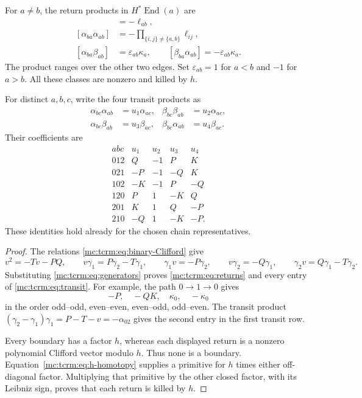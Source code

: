 \begin{proposition}\label{mc:tcrm:prop:composites}
For $a\ne b$, the return products in
$H^*\operatorname{End}(a)$ are
\begin{align}
 [\beta_{ba}\beta_{ab}]&=-\ell_{ab},\nonumber\\
 [\alpha_{ba}\alpha_{ab}]&=-
       \prod_{\{i,j\}\ne\{a,b\}}\ell_{ij},
       \label{mc:tcrm:eq:returns}\\
 [\alpha_{ba}\beta_{ab}]&=\varepsilon_{ab}\kappa_a,
 \qquad
 [\beta_{ba}\alpha_{ab}]=-\varepsilon_{ab}\kappa_a.
       \nonumber
\end{align}
The product ranges over the other two edges.
Set $\varepsilon_{ab}=1$ for $a<b$ and $-1$ for $a>b$.
All these classes are nonzero and killed by $h$.

For distinct $a,b,c$, write the four transit products as
\[
 \begin{aligned}
 \alpha_{bc}\alpha_{ab}&=u_1\alpha_{ac},&
 \beta_{bc}\beta_{ab}&=u_2\alpha_{ac},\\
 \alpha_{bc}\beta_{ab}&=u_3\beta_{ac},&
 \beta_{bc}\alpha_{ab}&=u_4\beta_{ac}.
 \end{aligned}
\]
Their coefficients are
\begin{equation}\label{mc:tcrm:eq:transit}
\begin{array}{c|rrrr}
 abc&u_1&u_2&u_3&u_4\\ \hline
 012&Q&-1&P&K\\
 021&-P&-1&-Q&K\\
 102&-K&-1&P&-Q\\
 120&P&1&-K&Q\\
 201&K&1&Q&-P\\
 210&-Q&1&-K&-P.
\end{array}
\end{equation}
These identities hold already for the chosen chain
representatives.
\end{proposition}

\begin{proof}
The relations \eqref{mc:tcrm:eq:binary-Clifford} give
\[
 v^2=-Tv-PQ,\qquad
 v\gamma_1=P\gamma_2-T\gamma_1,\qquad
 \gamma_1v=-P\gamma_2,\qquad
 v\gamma_2=-Q\gamma_1,\qquad
 \gamma_2v=Q\gamma_1-T\gamma_2.
\]
Substituting \eqref{mc:tcrm:eq:generators} proves
\eqref{mc:tcrm:eq:returns} and every entry of
\eqref{mc:tcrm:eq:transit}. For example, the path
$0\to1\to0$ gives
\[
 -P,\quad -QK,\quad \kappa_0,\quad-\kappa_0
\]
in the order odd--odd, even--even, even--odd,
odd--even. The transit product
$(\gamma_2-\gamma_1)\gamma_1=P-T-v=-\alpha_{02}$
gives the second entry in the first transit row.

Every boundary has a factor $h$, whereas each
displayed return is a nonzero polynomial Clifford
vector modulo $h$. Thus none is a boundary.
Equation~\eqref{mc:tcrm:eq:h-homotopy} supplies a primitive
for $h$ times either off-diagonal factor. Multiplying
that primitive by the other closed factor, with its
Leibniz sign, proves that each return is killed by $h$.
\end{proof}


